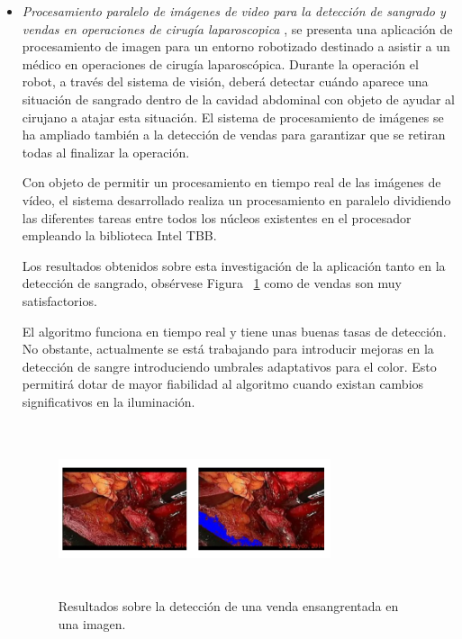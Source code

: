 \documentclass[10pt,journal]{IEEEtran}
\begin{document}
    \begin{itemize}
    \item  \textit{Procesamiento paralelo de imágenes de video para la detección de sangrado y vendas en operaciones de cirugía laparoscopica} \citep{derwael2015procesamiento}, se presenta una aplicación de procesamiento de imagen para un entorno robotizado destinado a asistir a un médico en operaciones de cirugía laparoscópica. Durante la operación el robot, a través del sistema de visión, deberá detectar cuándo aparece una situación de sangrado dentro de la cavidad abdominal con objeto de ayudar al cirujano a atajar esta situación. El sistema de procesamiento de imágenes se ha ampliado también a la detección de vendas para garantizar que se retiran todas al finalizar la operación.
    
    Con objeto de permitir un procesamiento en tiempo real de las imágenes de vídeo, el sistema desarrollado realiza un procesamiento en paralelo dividiendo las diferentes tareas entre todos los núcleos existentes en el procesador empleando la biblioteca Intel TBB. 
    
    Los resultados obtenidos sobre esta investigación de la aplicación tanto en la detección de sangrado, obsérvese Figura ~\ref{f76} como de vendas son muy satisfactorios.
    
    El algoritmo funciona en tiempo real y tiene unas buenas tasas de detección. No obstante, actualmente se está trabajando para introducir mejoras en la detección de sangre introduciendo umbrales adaptativos para el color. Esto permitirá dotar de mayor fiabilidad al algoritmo cuando existan cambios significativos en la iluminación.

     \begin{figure}[H]
        \begin{center}
        \includegraphics[width=8cm, height=5cm]{figuras/medicc.PNG}
        \caption{Resultados sobre la detección de una venda ensangrentada en una imagen.}
        \label{f76} 
        \end{center}
    \end{figure}
    \end{itemize}
    
\end{document}

